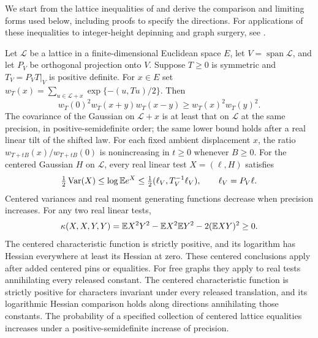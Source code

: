 We start from the lattice inequalities of
\citet[Theorem~2.1, Corollary~3.2, and Propositions~3.3 and~4.2]{RSD2017}
and derive the comparison and limiting forms used below, including
proofs to specify the directions.
For applications of these inequalities to integer-height depinning
and graph surgery, see \citet{AizenmanHarelPeledShapiro2022}.

\begin{lemma}\label{st:finite-gaussian}
Let $\mathcal L$ be a lattice in a finite-dimensional Euclidean space $E$,
let $V=\operatorname{span}\mathcal L$, and let $P_V$ be orthogonal projection
onto $V$. Suppose $T\ge0$ is symmetric and $T_V=P_VT|_V$ is positive
definite. For $x\in E$ set
$w_T(x)=\sum_{u\in\mathcal L+x}\exp\{-(u,Tu)/2\}$.
Then
\begin{equation}\label{st:lattice-inequality}
 w_T(0)^2w_T(x+y)w_T(x-y)\ge w_T(x)^2w_T(y)^2.
\end{equation}
The covariance of the Gaussian on $\mathcal L+x$ is at least that on
$\mathcal L$ at the same precision, in positive-semidefinite order; the
same lower bound holds after a real linear tilt of the shifted law. For
each fixed ambient displacement $x$, the ratio $w_{T+tB}(x)/w_{T+tB}(0)$
is nonincreasing in $t\ge0$ whenever $B\ge0$. For the centered Gaussian
$H$ on $\mathcal L$, every real linear test $X=(\ell,H)$ satisfies
\begin{equation}\label{st:mgf-sandwich}
 \tfrac12\operatorname{Var}(X)\le\log\mathbb E e^X
 \le\tfrac12(\ell_V,T_V^{-1}\ell_V),\qquad \ell_V=P_V\ell.
\end{equation}
Centered variances and real moment generating functions decrease when
precision increases. For any two real linear tests,
\begin{equation}\label{st:paired-cumulant}
 \kappa(X,X,Y,Y)
 =\mathbb E X^2Y^2-\mathbb E X^2\mathbb E Y^2-2(\mathbb E XY)^2\ge0.
\end{equation}
The centered characteristic function is strictly positive, and its logarithm
has Hessian everywhere at least its Hessian at zero.
These centered conclusions apply after added centered pins or equalities.
For free graphs they apply to real tests annihilating every released
constant. The centered characteristic function is strictly positive for
characters invariant under every released translation, and its logarithmic
Hessian comparison holds along directions annihilating those constants.
The probability of a specified collection of centered lattice equalities
increases under a positive-semidefinite increase of precision.
\end{lemma}

